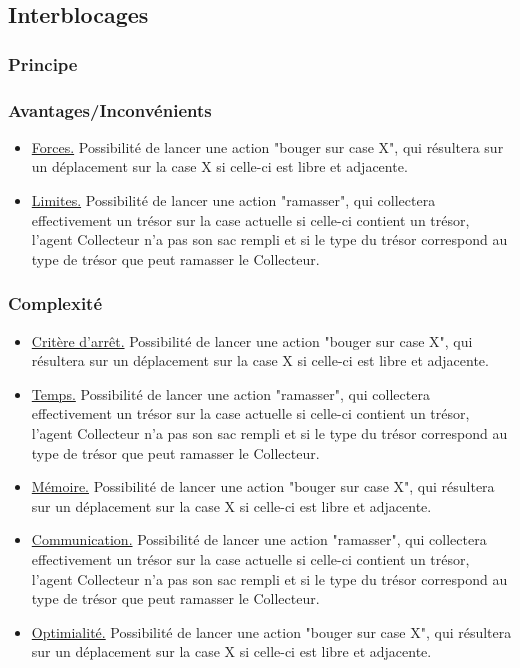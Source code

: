 \documentclass[a4paper, 10pt]{article}
\begin{document}
\subsection{Interblocages}

\subsubsection{Principe}

\blindtext

\subsubsection{Avantages/Inconvénients}

\begin{itemize}
            \item \underline{Forces.} Possibilité de lancer une action "bouger sur case X", qui résultera sur un déplacement sur la case {X} si celle-ci est libre et adjacente.
            \item \underline{Limites.} Possibilité de lancer une action "ramasser", qui collectera effectivement un trésor sur la case actuelle si celle-ci contient un trésor, l'agent Collecteur n'a pas son sac rempli et si le type du trésor correspond au type de trésor que peut ramasser le Collecteur.
\end{itemize}


\subsubsection{Complexité}

\begin{itemize}
            \item \underline{Critère d'arrêt.} Possibilité de lancer une action "bouger sur case X", qui résultera sur un déplacement sur la case {X} si celle-ci est libre et adjacente.
            \item \underline{Temps.} Possibilité de lancer une action "ramasser", qui collectera effectivement un trésor sur la case actuelle si celle-ci contient un trésor, l'agent Collecteur n'a pas son sac rempli et si le type du trésor correspond au type de trésor que peut ramasser le Collecteur.
            \item \underline{Mémoire.} Possibilité de lancer une action "bouger sur case X", qui résultera sur un déplacement sur la case {X} si celle-ci est libre et adjacente.
            \item \underline{Communication.} Possibilité de lancer une action "ramasser", qui collectera effectivement un trésor sur la case actuelle si celle-ci contient un trésor, l'agent Collecteur n'a pas son sac rempli et si le type du trésor correspond au type de trésor que peut ramasser le Collecteur.
            \item \underline{Optimialité.} Possibilité de lancer une action "bouger sur case X", qui résultera sur un déplacement sur la case {X} si celle-ci est libre et adjacente.
\end{itemize}
\end{document}
